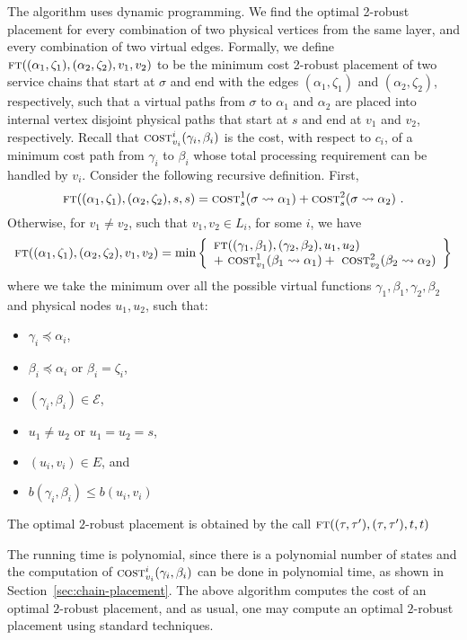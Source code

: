 \documentclass[11pt]{article}
\newcommand{\set}[1]{\left\{ #1 \right\}}
\newcommand{\calE}{\mathcal{E}}
\newcommand{\cost}{\textsc{cost}\xspace}
\newcommand{\ft}{\textsc{ft}\xspace}
\begin{document}
The algorithm uses dynamic programming.  We find the optimal 2-robust
placement for every combination of two physical vertices from the same
layer, and every combination of two virtual edges.
%
Formally, we define $\ft((\alpha_1,\zeta_1), (\alpha_2,\zeta_2), v_1,
v_2)$ to be the minimum cost 2-robust placement of two service chains
that start at $\sigma$ and end with the edges $(\alpha_1,\zeta_1)$ and
$(\alpha_2,\zeta_2)$, respectively, such that a virtual paths from
$\sigma$ to $\alpha_1$ and $\alpha_2$ are placed into internal vertex
disjoint physical paths that start at $s$ and end at $v_1$ and $v_2$,
respectively.
%
Recall that $\cost^i_{v_i}(\gamma_i,\beta_i)$ is the cost, with
respect to $c_i$, of a minimum cost path from $\gamma_i$ to $\beta_i$
whose total processing requirement can be handled by $v_i$.
%
Consider the following recursive definition.  First,
\[
\ft((\alpha_1,\zeta_1),(\alpha_2,\zeta_2),s,s)
= \cost^1_{s}(\sigma \leadsto \alpha_1) +
  \cost^2_{s}(\sigma \leadsto \alpha_2)
~.
\]
Otherwise, for $v_1 \neq v_2$, such that $v_1, v_2 \in L_i$, for some
$i$, we have
\[
\ft((\alpha_1,\zeta_1),(\alpha_2,\zeta_2),v_1,v_2)
=
\min\set{
%
\begin{array}{l}
\ft((\gamma_1,\beta_1),(\gamma_2,\beta_2),u_1,u_2) \\ 
+~ \cost^1_{v_1}(\beta_1 \leadsto \alpha_1) 
+~ \cost^2_{v_2}(\beta_2 \leadsto \alpha_2)
\end{array}
}
\]
where we take the minimum over all the possible virtual functions
$\gamma_1, \beta_1, \gamma_2, \beta_2$ and physical nodes $u_1, u_2$,
such that:
\begin{itemize}
  \item $\gamma_i \preceq \alpha_i$,
  \item $\beta_i \preceq \alpha_i$ or $\beta_i = \zeta_i$,
  \item $(\gamma_i,\beta_i) \in \calE$,
  \item $u_1 \neq u_2$ or $u_1 = u_2 = s$,
  \item $(u_i,v_i) \in E$, and
  \item $b(\gamma_i,\beta_i) \leq b(u_i,v_i)$
\end{itemize}
 
The optimal $2$-robust placement is obtained by the call
$\ft((\tau,\tau'),(\tau,\tau'),t,t)$

The running time is polynomial, since there is a polynomial number of
states and the computation of $\cost^i_{v_i}(\gamma_i,\beta_i)$ can be
done in polynomial time, as shown in
Section~\ref{sec:chain-placement}.  The above algorithm computes the
cost of an optimal $2$-robust placement, and as usual, one may compute
an optimal $2$-robust placement using standard techniques.
\end{document}
